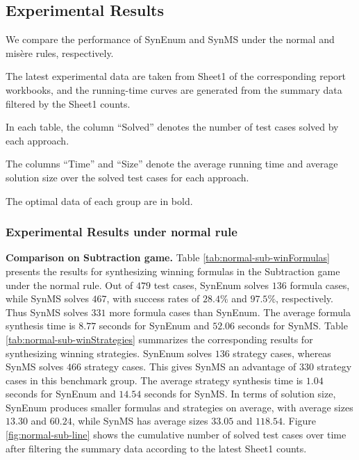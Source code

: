 \subsection{Experimental Results}


We compare the performance of SynEnum and SynMS under the normal and mis\`{e}re rules, respectively.

The latest experimental data are taken from Sheet1 of the corresponding report workbooks, and the running-time curves are generated from the summary data filtered by the Sheet1 counts.

In each table, the column ``Solved'' denotes the number of test cases solved by each approach.

The columns ``Time'' and ``Size'' denote the average running time and average solution size over the solved test cases for each approach.

The optimal data of each group are in bold.

\subsubsection{Experimental Results under normal rule}

\textbf{Comparison on Subtraction game.}
Table \ref{tab:normal-sub-winFormulas} presents the results for synthesizing winning formulas in the Subtraction game under the normal rule.
Out of $479$ test cases, SynEnum solves $136$ formula cases, while SynMS solves $467$, with success rates of $28.4\%$ and $97.5\%$, respectively.
Thus SynMS solves $331$ more formula cases than SynEnum.
The average formula synthesis time is $8.77$ seconds for SynEnum and $52.06$ seconds for SynMS.
Table \ref{tab:normal-sub-winStrategies} summarizes the corresponding results for synthesizing winning strategies.
SynEnum solves $136$ strategy cases, whereas SynMS solves $466$ strategy cases.
This gives SynMS an advantage of $330$ strategy cases in this benchmark group.
The average strategy synthesis time is $1.04$ seconds for SynEnum and $14.54$ seconds for SynMS.
In terms of solution size, SynEnum produces smaller formulas and strategies on average, with average sizes $13.30$ and $60.24$, while SynMS has average sizes $33.05$ and $118.54$.
Figure \ref{fig:normal-sub-line} shows the cumulative number of solved test cases over time after filtering the summary data according to the latest Sheet1 counts.

